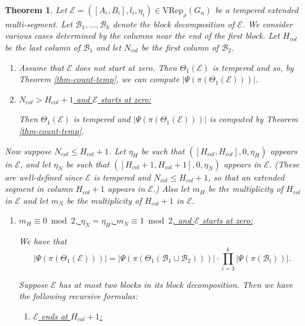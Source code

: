 \documentclass[11pt,letterpaper]{amsart}
\newcommand{\VRep}{{\mathrm{VRep}}}
\newcommand{\BB}{\mathcal{B}}
\newcommand{\EE}{\mathcal{E}}
\newtheorem{thm}{Theorem}[section]
\numberwithin{equation}{section}
\begin{document}
\begin{thm}
\label{thm-count-theta-temp}
    Let $\EE = ([A_i, B_i], l_i, \eta_i)\in\VRep_\rho(G_n)$ be a tempered extended multi-segment. 
    Let $\mathcal{B}_1, \dots, \mathcal{B}_k$ denote the block decomposition of $\EE$. We consider various cases determined by the columns near the end of the first block.
    Let $H_{col}$ be the last column of $\mathcal{B}_1$ and let $N_{col}$ be the first column of $\mathcal{B}_2$.
    \begin{enumerate}

    \item[Case 1.] Assume that $\EE$ does not start at zero. Then $\Theta_1(\EE)$ is tempered and so, by Theorem \ref{thm-count-temp}, we can compute $|\Psi(\pi(\Theta_1(\EE)))|$.

    
    \item [Case 2.] \underline{$N_{col} > H_{col}+1$ and $\EE$ starts at zero:} %

         Then $\Theta_1(\EE)$ is tempered and $|\Psi(\pi(\Theta_1(\EE)))|$ is computed by Theorem \ref{thm-count-temp}.
    \end{enumerate}
    Now suppose $N_{col} \leq H_{col}+1$. Let $\eta_H$ be such that $([H_{col}, H_{col}], 0, \eta_H)$ appears in $\EE$, and let $\eta_N$ be such that $([H_{col}+1, H_{col}+1], 0, \eta_N)$ appears in $\EE$. (These are well-defined since $\EE$ is tempered and $N_{col} \leq H_{col}+1$, so that an extended segment in column $H_{col}+1$ appears in $\EE$.) Also let $m_H$ be the multiplicity of $H_{col}$ in $\EE$ and let $m_N$ be the multiplicity of $H_{col}+1$ in $\EE$.
   
    
    \begin{enumerate}
        \item [Case 3.] \underline{$m_H \equiv 0 \bmod{2}$, $\eta_N = \eta_H$, $m_N \equiv 1 \bmod{2}$, and $\EE$ starts at zero:} %
        
        We have that
        \[|\Psi(\pi(\Theta_1(\EE)))| = |\Psi(\pi(\Theta_1(\BB_1 \cup \BB_2)))| \cdot \prod_{i=3}^k |\Psi(\pi(\BB_i))|.\]
        
        Suppose $\EE$ has at most two blocks in its block decomposition. Then we have the following recursive formulas:

        \begin{enumerate}
            \item [Case 3.1.] \underline{$\EE$ ends at $H_{col}+1$:}


\end{enumerate}
\end{enumerate}
\end{thm}
\end{document}
